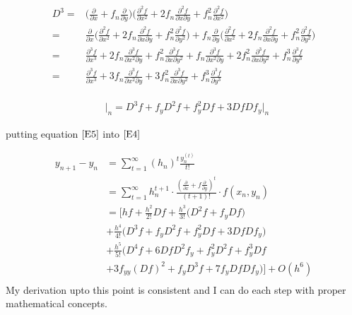 \documentclass[12 pt]{article}
\begin{document}
	{
		\large
		\begin{equation*}
			\begin{split}
				D^{3} =& \bigg(\frac{\partial }{\partial x} + f_{n}\frac{\partial }{\partial y}\bigg)\bigg(\frac{\partial^{2}f}{\partial x^{2}} + 2f_{n}\frac{\partial^{2}f}{\partial x \partial y} + f_{n}^{2}\frac{\partial^{2}f}{\partial x^{2}}\bigg)\\
				=& \frac{\partial }{\partial x}\bigg(\frac{\partial^{2}f}{\partial x^{2}} + 2f_{n}\frac{\partial^{2}f}{\partial x \partial y} + f_{n}^{2}\frac{\partial^{2}f}{\partial y^{2}}\bigg) + f_{n}\frac{\partial }{\partial y}\bigg(\frac{\partial^{2}f}{\partial x^{2}} + 2f_{n}\frac{\partial^{2}f}{\partial x \partial y} + f_{n}^{2}\frac{\partial^{2}f}{\partial y^{2}}\bigg)\\
				=& \frac{\partial^{3}f}{\partial x^{3}} + 2f_{n}\frac{\partial^{3}f}{\partial x^{2}\partial y} + f_{n}^{2}\frac{\partial^{3}f}{\partial x\partial y^{2}} + f_{n}\frac{\partial^{3}f}{\partial x^{2}\partial y} + 2f_{n}^{2}\frac{\partial^{3}f}{\partial x\partial y^{2}} + f_{n}^{3}\frac{\partial^{3}f}{\partial y^{3}}\\ 
				=& \frac{\partial^{3}f}{\partial x^{3}} + 3f_{n}\frac{\partial^{3}f}{\partial x^{2}\partial y} + 3f_{n}^{2}\frac{\partial^{3}f}{\partial x\partial y^{2}} + f_{n}^{3}\frac{\partial^{3}f}{\partial y^{3}}\\
			\end{split}
		\end{equation*}
	}
	
	{
		\Large
		\begin{equation*}
			\frac{\mathop{\mathrm{d^{3}f}}}{\mathop{\mathrm{dx^{3}}}}\Big\vert_{n} = D^{3}f + f_{y}D^{2}f + f_{y}^{2}Df + 3DfDf_{y}\Big\vert_{n}
		\end{equation*}
	}
	
	putting equation $\ref{E5}$ into $\ref{E4}$ 
	
	\begin{equation}\label{E6}
		\begin{split}
			y_{n+1}-y_{n} &= \sum_{t = 1}^{\infty}(h_{n})^{t}\frac{y_{n}^{(t)}}{t!}\\
			&= \sum_{t = 1}^{\infty}h_{n}^{t+1}\cdot \frac{(\frac{\partial }{\partial x} +f\frac{\partial }{\partial y})^{t}}{(t+1)!}\cdot f(x_{n},y_{n})\\
			&=\bigg[hf + \frac{h^{2}}{2!}Df + \frac{h^{3}}{3!}\bigg(D^{2}f+f_{y}Df\bigg)  \\
			& + \frac{h^{4}}{4!}\bigg(D^{3}f + f_{y}D^{2}f + f_{y}^{2}Df + 3DfDf_{y}\bigg) \\
			& + \frac{h^{5}}{5!}\bigg(D^{4}f+6DfD^{2}f_{y} + f_{y}^{2}D^{2}f + f_{y}^{3}Df \\
			& + 3f_{yy}(Df)^{2} + f_{y}D^{3}f + 7f_{y}DfDf_{y}\bigg)\bigg] + O(h^{6})\\
		\end{split}
	\end{equation}
	{
		\color{red}
		\large
		My derivation upto this point is consistent and I can do each step with proper mathematical concepts.
	}
	
\end{document}
